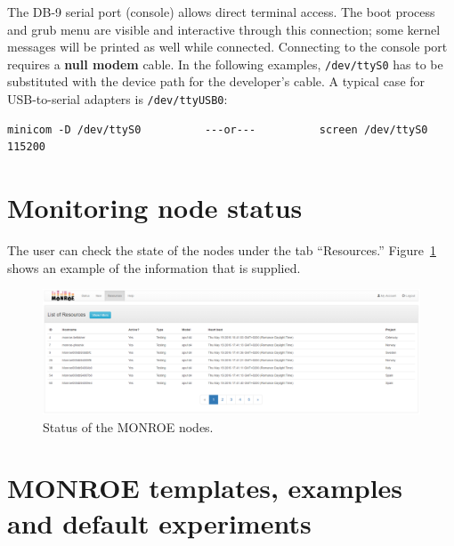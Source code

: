 \documentclass[a4paper,10pt]{article}
\newcommand{\monroe}{MONROE}
\newcommand{\identifier}[1]{{\texttt{\small{#1}}}}
\begin{document}
The DB-9 serial port (console) allows direct terminal access.
The boot process and grub menu are visible and interactive through this connection; some kernel messages will be printed as well while connected.
Connecting to the console port requires a \textbf{null modem} cable.
In the following examples, \identifier{/dev/ttyS0} has to be substituted with the device path for the developer's cable.
A typical case for USB-to-serial adapters is \identifier{/dev/ttyUSB0}:
\begin{verbatim}
minicom -D /dev/ttyS0          ---or---          screen /dev/ttyS0 115200
\end{verbatim}



\section{Monitoring node status}
\label{subsec:nodeStatus}

The user can check the state of the nodes under the tab ``Resources.'' Figure~\ref{fig:Resources} shows an example of the information that is supplied.

\begin{figure}[tp]
	\centering
	\includegraphics[width=1\textwidth]{Resources.png}
	\caption{Status of the \monroe{} nodes.}
	\label{fig:Resources}
\end{figure}



\section{\monroe{} templates, examples and default experiments}
\label{sec:examples}
\end{document}
